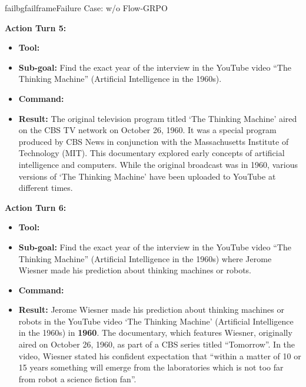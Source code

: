 \begin{small}
\begin{center}
\begin{casebox}{failbg}{failframe}{Failure Case: \model w/o Flow-GRPO}
    \vspace{1em}

    \textbf{Action Turn 5:}
    \begin{itemize}[nosep, leftmargin=*]
        \item \textbf{Tool:} 
        \item \textbf{Sub-goal:} Find the exact year of the interview in the YouTube video ``The Thinking Machine'' (Artificial Intelligence in the 1960s).
        \item \textbf{Command:}

        \item \textbf{Result:} The original television program titled `The Thinking Machine' aired on the CBS TV network on October 26, 1960. It was a special program produced by CBS News in conjunction with the Massachusetts Institute of Technology (MIT). This documentary explored early concepts of artificial intelligence and computers. While the original broadcast was in 1960, various versions of `The Thinking Machine' have been uploaded to YouTube at different times.
    \end{itemize}

    \vspace{1em}

    \textbf{Action Turn 6:}
    \begin{itemize}[nosep, leftmargin=*]
        \item \textbf{Tool:} 
        \item \textbf{Sub-goal:} Find the exact year of the interview in the YouTube video ``The Thinking Machine'' (Artificial Intelligence in the 1960s) where Jerome Wiesner made his prediction about thinking machines or robots.
        \item \textbf{Command:}

        \item \textbf{Result:} Jerome Wiesner made his prediction about thinking machines or robots in the YouTube video `The Thinking Machine' (Artificial Intelligence in the 1960s) in \textbf{1960}. The documentary, which features Wiesner, originally aired on October 26, 1960, as part of a CBS series titled ``Tomorrow''. In the video, Wiesner stated his confident expectation that ``within a matter of 10 or 15 years something will emerge from the laboratories which is not too far from robot a science fiction fan''.
    \end{itemize}


\end{casebox}
\end{center}
\end{small}
